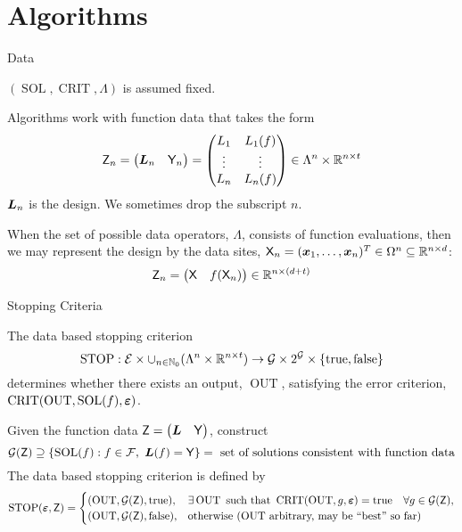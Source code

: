 \documentclass[10pt,compress,xcolor={usenames,dvipsnames},aspectratio=169]{beamer}
\DeclareMathOperator{\STOP}{STOP}
\DeclareMathOperator{\SOL}{SOL}
\DeclareMathOperator{\OUT}{OUT}
\DeclareMathOperator{\CRIT}{CRIT}
\newcommand{\ttrue}{\text{true}}
\newcommand{\tfalse}{\text{false}}
\begin{document}
\section{Algorithms}


\begin{frame}{Data}
	
	\vspace{-5ex}
	$(\SOL, \CRIT, \Lambda)$ is assumed fixed.
	
	Algorithms work with function data that takes the form
	\[
	\mathsf{Z}_n 
	= \begin{pmatrix} \boldsymbol{L}_n & \mathsf{Y}_n \end{pmatrix}
	=  \begin{pmatrix} L_{1} & L_{1}(f) \\ \vdots & \vdots \\ L_{n} & L_{n}(f) \end{pmatrix} 
	\in \Lambda^n \times \mathbb{R}^{n\times t}
	\]
	$\boldsymbol{L}_n$ is the \alert{design}.  We sometimes drop the subscript $n$.
	
	When the set of possible data operators, $\Lambda$, consists of function evaluations, then we may represent the design by the data sites, $\mathsf{X}_n = (\boldsymbol{x}_1, \ldots, \boldsymbol{x}_n)^T \in \Omega^n \subseteq \mathbb{R}^{n \times d}$:
	\[
	\mathsf{Z}_{n} = \begin{pmatrix} \mathsf{X} & f(\mathsf{X}_{n}) \end{pmatrix} \in  \mathbb{R}^{n \times (d+t)}
	\]
	
	
\end{frame}


\begin{frame}{Stopping Criteria}

\vspace{-5ex}
The \alert{data based} stopping criterion
\[
\STOP:  \ce  \times \cup_{n \in \natzero} (\Lambda^n \times \reals^{n\times t} ) \to \cg \times 2^\cg \times \{\ttrue, \tfalse \}
\]
determines whether there exists an output, $\OUT$, satisfying the error criterion, $\CRIT(\OUT,\SOL(f),\veps)$.   

Given the function data $\mathsf{Z} =\begin{pmatrix}\boldsymbol{L} & \mathsf{Y}\end{pmatrix}$,  construct 
\[
\cg(\mZ) \supseteq \{\SOL(f) :   f \in \cf, \ \vL(f) = \mY   \} = \text{ set of solutions consistent with function data}
\]
The data based stopping criterion is defined by
\[
\STOP(\veps,\mZ) = \begin{cases} 
	(\OUT,\cg(\mZ), \ttrue), & 
	\exists \OUT \text{ such that } \CRIT(\OUT,g,\veps) = \ttrue \quad \forall g \in \cg(\mZ), \\
	(\OUT,\cg(\mZ),\tfalse), & \text{otherwise ($\OUT$ arbitrary, may be ``best'' so far)}
	\end{cases}
\]

\end{frame}
\end{document}
